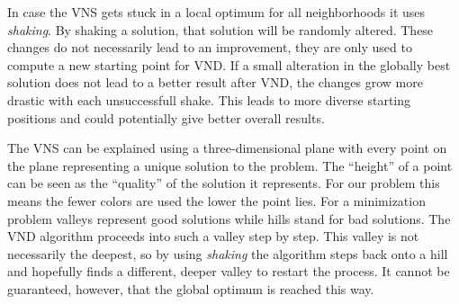 \documentclass[paper = a4, fontsize = 10pt]{scrartcl}
\begin{document}
{In case the VNS gets stuck in a local optimum for all neighborhoods it uses \emph{shaking}. By shaking a solution, that solution will be randomly altered. These changes do not necessarily lead to an improvement, they are only used to compute a new starting point for VND. If a small alteration in the globally best solution does not lead to a better result after VND, the changes grow more drastic with each unsuccessfull shake. This leads to more diverse starting positions and could potentially give better overall results.


The VNS can be explained using a three-dimensional plane with every point on the plane representing a unique solution to the problem. The \enquote{height} of a point can be seen as the \enquote{quality} of the solution it represents. For our problem this means the fewer colors are used the lower the point lies. For a minimization problem valleys represent good solutions while hills stand for bad solutions. The VND algorithm proceeds into such a valley step by step. This valley is not necessarily the deepest, so by using \emph{shaking} the algorithm steps back onto a hill and hopefully finds a different, deeper valley to restart the process. It cannot be guaranteed, however, that the global optimum is reached this way.



}
\end{document}
